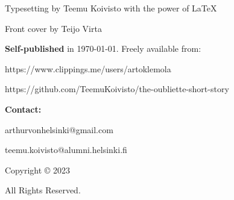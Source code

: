 \pagestyle{empty} %

{\small
\setlength{\parindent}{0em}\setlength{\parskip}{0em}

Typesetting by Teemu Koivisto with the power of \LaTeX

Front cover by Teijo Virta \newline

\textbf{Self-published} in \today. Freely available from: 

https://www.clippings.me/users/artoklemola

https://github.com/TeemuKoivisto/the-oubliette-short-story \newline

\textbf{Contact:}

arthurvonhelsinki@gmail.com

teemu.koivisto@alumni.helsinki.fi

\vfill

Copyright \copyright{} 2023 \authorname \vspace{2pt}

All Rights Reserved.
}